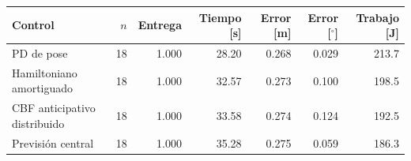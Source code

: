 \begin{tabular}{lrrrrrr}
\toprule
Control & $n$ & Entrega & Tiempo [s] & Error [m] & Error [$^\circ$] & Trabajo [J] \\
\midrule
PD de pose & 18 & 1.000 & 28.20 & 0.268 & 0.029 & 213.7 \\
Hamiltoniano amortiguado & 18 & 1.000 & 32.57 & 0.273 & 0.100 & 198.5 \\
CBF anticipativo distribuido & 18 & 1.000 & 33.58 & 0.274 & 0.124 & 192.5 \\
Previsión central & 18 & 1.000 & 35.28 & 0.275 & 0.059 & 186.3 \\
\bottomrule
\end{tabular}
